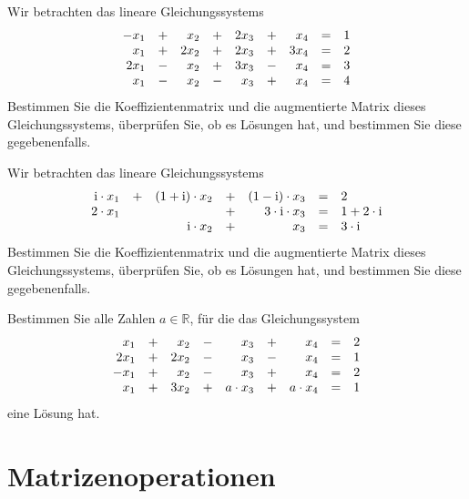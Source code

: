 \begin{aufgabe} Wir betrachten das lineare Gleichungssystems
  	$$ \begin{array} {r c r c r c r c l}
   	-x_1 & +  &  x_2 & + &  2 x_3 & + & x_4 & = & 1 \\
   	x_1 &  +  &  2 x_2  & + & 2 x_3 & + & 3 x_4 & = & 2  \\
   	2 x_1 & - &  x_2 & +  & 3 x_3   & - &  x_4 & = & 3 \\
  	x_1 & - & x_2 & - & x_3 & + & x_4 & = & 4
   	\end{array} $$
Bestimmen Sie die Koeffizientenmatrix und die augmentierte Matrix dieses Gleichungssystems, 
überprüfen Sie, ob es Lösungen hat, und bestimmen Sie diese gegebenenfalls.
\end{aufgabe}

\begin{aufgabe} Wir betrachten das lineare Gleichungssystems
  	$$ \begin{array} {r c r c r  c l}
   	\ii \cdot x_1 & +  &  (1+\ii) \cdot x_2 & + &  (1-\ii) \cdot x_3 &  = & 2 \\
   	2 \cdot x_1 &     &    & + & 3 \cdot \ii \cdot x_3 &  = & 1+2 \cdot \ii  \\
    	&  &  \ii \cdot  x_2 & +  &  x_3   &  = & 3 \cdot \ii \\
   \end{array} $$
Bestimmen Sie die Koeffizientenmatrix und die augmentierte Matrix dieses Gleichungssystems, 
überprüfen Sie, ob es Lösungen hat, und bestimmen Sie diese gegebenenfalls.
\end{aufgabe}

\begin{aufgabe} Bestimmen Sie alle Zahlen $a \in \mathbb R$, für die das Gleichungssystem
  	$$ \begin{array} {r c r c r c r c l}
  	 x_1 & + &  x_2 & - &  x_3 & + & x_4 & = & 2 \\
   	2 x_1 & +  & 2 x_2  & - &  x_3 & - &  x_4 & = & 1 \\
  	-x_1 & + & x_2 & - & x_3 & + & x_4 & = & 2 \\
   	x_1 & + & 3 x_2 & +  & a \cdot x_3  & + & a \cdot x_4 & = & 1 
    	\end{array} $$
eine Lösung hat.
\end{aufgabe}

\newpage


\section{Matrizenoperationen}\label{gls_matrix_op}

